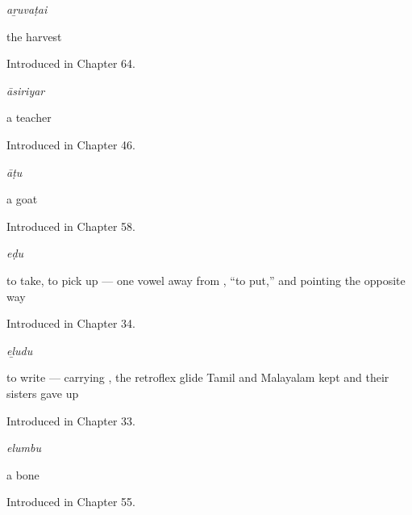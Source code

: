 \noindent\begin{minipage}[t]{\linewidth}
\raggedright
\textbf{}\enspace\emph{aṟuvaṭai}\par
\small the harvest\par
\footnotesize Introduced in Chapter 64.
\end{minipage}\par\medskip

\noindent\begin{minipage}[t]{\linewidth}
\raggedright
\textbf{}\enspace\emph{āsiriyar}\par
\small a teacher\par
\footnotesize Introduced in Chapter 46.
\end{minipage}\par\medskip

\noindent\begin{minipage}[t]{\linewidth}
\raggedright
\textbf{}\enspace\emph{āṭu}\par
\small a goat\par
\footnotesize Introduced in Chapter 58.
\end{minipage}\par\medskip

\noindent\begin{minipage}[t]{\linewidth}
\raggedright
\textbf{}\enspace\emph{eḍu}\par
\small to take, to pick up — one vowel away from , \textquotedblleft{}to put,\textquotedblright{} and pointing the opposite way\par
\footnotesize Introduced in Chapter 34.
\end{minipage}\par\medskip

\noindent\begin{minipage}[t]{\linewidth}
\raggedright
\textbf{}\enspace\emph{eḻudu}\par
\small to write — carrying , the retroflex glide Tamil and Malayalam kept and their sisters gave up\par
\footnotesize Introduced in Chapter 33.
\end{minipage}\par\medskip

\noindent\begin{minipage}[t]{\linewidth}
\raggedright
\textbf{}\enspace\emph{elumbu}\par
\small a bone\par
\footnotesize Introduced in Chapter 55.
\end{minipage}\par\medskip

